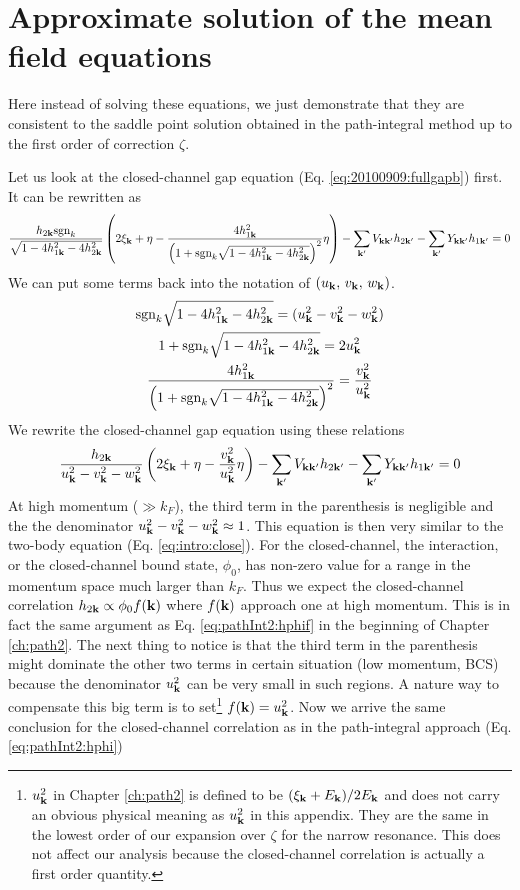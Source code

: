 \section{Approximate solution of the mean field equations}
Here instead of solving these equations, we just demonstrate that they are consistent to the saddle point solution obtained in the path-integral method up to the first order of correction $\zeta$.

Let us look at the closed-channel gap equation (Eq. \ref{eq:20100909:fullgapb}) first.  It can be rewritten as 
\begin{multline*}
\frac{h_{2\mathbf{k}} \text{sgn}_{k}}{\sqrt{1-4 h_{1\mathbf{k}}^2-4 h_{2\mathbf{k}}^2}}\left(2 \xi_{\mathbf{k}}+\eta-\frac{4 h_{1\mathbf{k}}^{2}}{\left(1+\text{sgn}_{k}\sqrt{1-4 h_{1\mathbf{k}}^2-4 h_{2\mathbf{k}}^2}\right)^2}\eta\right)
-\sum_{\mathbf{k}'}V_{\mathbf{k}\mathbf{k}'}h_{2\mathbf{k}'}-\sum_{\mathbf{k}'}Y_{\mathbf{k}\mathbf{k}'}h_{1\mathbf{k}'}=0
\end{multline*}
We can put some terms back into the notation of $(u_{\mathbf{k}},\,v_{\mathbf{k}},\, w_{\mathbf{k}})$.
\begin{gather}
\text{sgn}_{k}\sqrt{1-4 h_{1\mathbf{k}}^2-4 h_{2\mathbf{k}}^2}=(u^{2}_{\mathbf{k}}-v_{\mathbf{k}}^{2}-w_{\mathbf{k}}^{2})\\
1+\text{sgn}_{k}\sqrt{1-4 h_{1\mathbf{k}}^2-4 h_{2\mathbf{k}}^2}=2u_{\mathbf{k}}^{2}\label{eq:meanfield:1sqrt}\\
\frac{4 h_{1\mathbf{k}}^{2} }{\left(1+\text{sgn}_{k}\sqrt{1-4 h_{1\mathbf{k}}^2-4 h_{2\mathbf{k}}^2}\right)^2}=\frac{v_{\mathbf{k}}^{2}}{u_{\mathbf{k}}^{2}}
\end{gather}
We rewrite the closed-channel gap equation using these relations
\begin{equation*}
\frac{h_{2\mathbf{k}}}{u^{2}_{\mathbf{k}}-v_{\mathbf{k}}^{2}-w_{\mathbf{k}}^{2}}\left(2 \xi_{\mathbf{k}}+\eta-\frac{v_{\mathbf{k}}^{2}}{u_{\mathbf{k}}^{2}}\eta\right)-\sum_{\mathbf{k}'}V_{\mathbf{k}\mathbf{k}'}h_{2\mathbf{k}'}-\sum_{\mathbf{k}'}Y_{\mathbf{k}\mathbf{k}'}h_{1\mathbf{k}'}=0
\end{equation*}
At high momentum ($\gg{}k_{F}$),  the third term in the parenthesis is negligible and the the denominator $u^{2}_{\mathbf{k}}-v_{\mathbf{k}}^{2}-w_{\mathbf{k}}^{2}\approx1$.  This equation is then very similar to the two-body \sch equation (Eq. \ref{eq:intro:close}). For the closed-channel, the interaction, or the closed-channel bound state, $\phi_{0}$, has non-zero value for a range  in the momentum space much larger than $k_{F}$.  Thus we expect the closed-channel correlation $h_{2\mathbf{k}}\propto\phi_{0}f(\mathbf{k})$ where $f(\mathbf{k})$ approach one at high momentum.  This is in fact the same argument as Eq. \ref{eq:pathInt2:hphif}  in the beginning of Chapter \ref{ch:path2}.  The next thing to notice is that the third term in the parenthesis might dominate the other two terms in  certain situation (low momentum, BCS) because the denominator  $u_{\mathbf{k}}^{2}$ can be very small in such regions.  A nature way to compensate this big term is to set\footnote{$u_{\mathbf{k}}^{2}$ in Chapter \ref{ch:path2} is defined to be $(\xi_{\mathbf{k}}+E_{\mathbf{k}})/2E_{\mathbf{k}}$ and does not carry an obvious physical meaning as $u_{\mathbf{k}}^{2}$ in this appendix. They are the same in the lowest order of our expansion over $\zeta$ for the narrow resonance. This does not affect our analysis because the closed-channel correlation is actually a first order quantity.} $f(\mathbf{k})=u_{\mathbf{k}}^{2}$.  Now we arrive the same conclusion for the closed-channel correlation as in the path-integral approach (Eq. \ref{eq:pathInt2:hphi})
